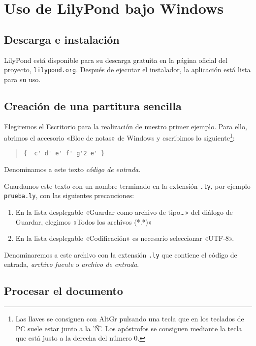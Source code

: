 \documentclass[a4paper,10pt,oneside,headinclude,titlepage]{article} %
\begin{document}
\section[1]{Uso de LilyPond bajo Windows}
\subsection{Descarga e instalación}

LilyPond está disponible para su descarga gratuita en la página
oficial del proyecto, \texttt{lilypond.org}.  Después de
ejecutar el instalador, la aplicación está lista para su uso.

\subsection{Creación de una partitura sencilla}

Elegiremos el Escritorio para la realización de nuestro primer
ejemplo. Para ello, abrimos el accesorio «Bloc de notas» de Windows y
escribimos lo siguiente\footnote{Las llaves se consiguen con AltGr
  pulsando una tecla que en los teclados de PC suele estar junto a la
  'Ñ'. Los apóstrofos se consiguen mediante la tecla que está justo a
  la derecha del número 0.}:

\begin{quote}
\begin{verbatim}
{  c' d' e' f' g'2 e' }
\end{verbatim}
\end{quote}

Denominamos a este texto \emph{código de entrada}.

Guardamos este texto con un nombre terminado en la extensión
\verb+.ly+, por ejemplo \verb+prueba.ly+, con las siguientes
precauciones:

\begin{enumerate}
\item En la lista desplegable «Guardar como archivo de tipo\ldots» del
  diálogo de Guardar, elegimos «Todos los archivos (*.*)»
\item En la lista desplegable «Codificación» es necesario seleccionar
  «UTF-8».
\end{enumerate}

Denominaremos a este archivo con la extensión \verb+.ly+ que
contiene el código de entrada, \emph{archivo fuente} o
\emph{archivo de entrada}.

\subsection{Procesar el documento}
\end{document}
